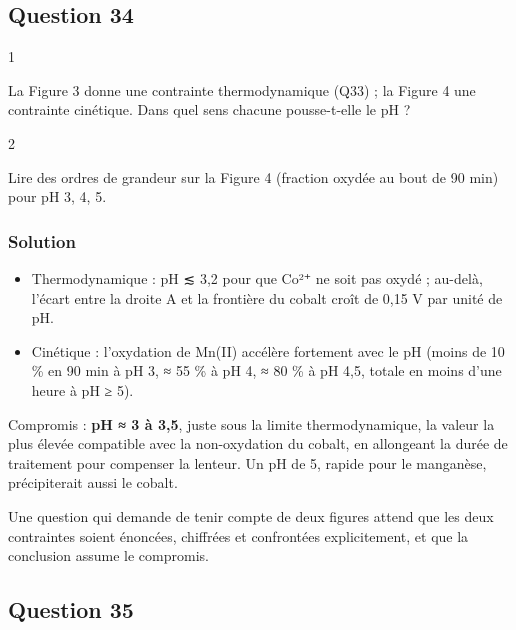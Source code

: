 \documentclass[11pt,a4paper]{article}
\providecommand{\tightlist}{\setlength{\itemsep}{0pt}\setlength{\parskip}{0pt}}
\begin{document}
\hypertarget{question-34}{%
\subsection{Question 34}\label{question-34}}

\begin{indication}{1}

La Figure 3 donne une contrainte thermodynamique (Q33) ; la Figure 4 une contrainte cinétique. Dans quel sens chacune pousse-t-elle le pH ?

\end{indication}

\begin{indication}{2}

Lire des ordres de grandeur sur la Figure 4 (fraction oxydée au bout de 90 min) pour pH 3, 4, 5.

\end{indication}

\hypertarget{solution-33}{%
\subsubsection{Solution}\label{solution-33}}

\begin{itemize}
\tightlist
\item
  Thermodynamique : pH ≲ 3,2 pour que Co²⁺ ne soit pas oxydé ; au-delà, l'écart entre la droite A et la frontière du cobalt croît de 0,15 V par unité de pH.
\item
  Cinétique : l'oxydation de Mn(II) accélère fortement avec le pH (moins de 10 \% en 90 min à pH 3, ≈ 55 \% à pH 4, ≈ 80 \% à pH 4,5, totale en moins d'une heure à pH ≥ 5).
\end{itemize}

Compromis : \textbf{pH ≈ 3 à 3,5}, juste sous la limite thermodynamique, la valeur la plus élevée compatible avec la non-oxydation du cobalt, en allongeant la durée de traitement pour compenser la lenteur. Un pH de 5, rapide pour le manganèse, précipiterait aussi le cobalt.

\begin{jury}

Une question qui demande de tenir compte de deux figures attend que les deux contraintes soient énoncées, chiffrées et confrontées explicitement, et que la conclusion assume le compromis.

\end{jury}

\hypertarget{question-35}{%
\subsection{Question 35}\label{question-35}}
\end{document}
